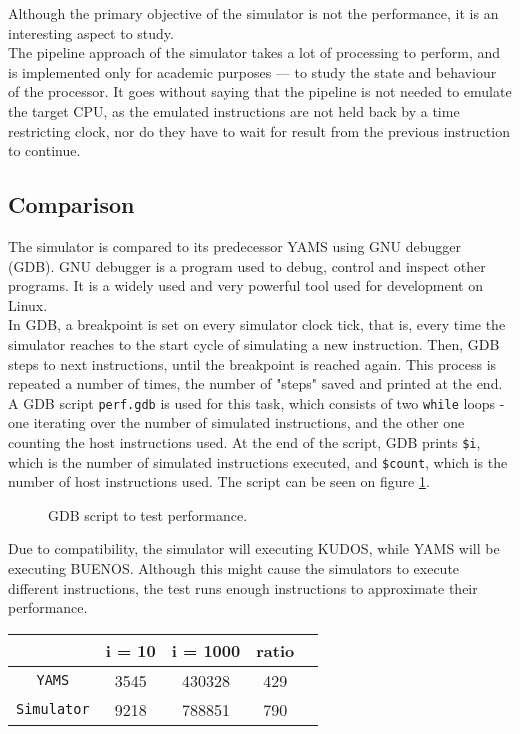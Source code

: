 Although the primary objective of the simulator is not the performance, it is
an interesting aspect to study.\\
The pipeline approach of the simulator takes a lot of processing to perform,
and is implemented only for academic purposes --- to study the state and behaviour
of the processor. It goes without saying that the pipeline is not needed to
emulate the target CPU, as the emulated instructions are not held back by a time
restricting clock, nor do they have to wait for result from the previous instruction to
continue.\\

\subsection{Comparison}
The simulator is compared to its predecessor YAMS using GNU debugger (GDB). GNU debugger
is a program used to debug, control and inspect other programs. It is a widely
used and very powerful tool used for development on Linux\cite{gdb}.\\
In GDB, a breakpoint is set on every simulator clock tick, that is, every time
the simulator reaches to the start cycle of simulating a new instruction. Then,
GDB steps to next instructions, until the breakpoint is reached again. This
process is repeated a number of times, the number of "steps" saved and printed
at the end. A GDB script \texttt{perf.gdb} is used for this task, which consists
of two \texttt{while} loops - one iterating over the number of simulated instructions,
and the other one counting the host instructions used. At the end of the script,
GDB prints \texttt{\$i}, which is the number of simulated instructions executed,
and \texttt{\$count}, which is the number of host instructions used. The script
can be seen on figure \ref{fig:gdb_perf}.
\begin{figure}

\caption{GDB script to test performance.}
\label{fig:gdb_perf}
\end{figure}

Due to compatibility, the simulator will executing KUDOS, while YAMS will be
executing BUENOS. Although this might cause the simulators to execute different
instructions, the test runs enough instructions to approximate their performance.

\begin{center}
    \begin{tabular}{ | c | c | c | c | r | }
    \hline
    & i = 10 & i = 1000 & ratio \\ \hline \hline
    \texttt{YAMS} & 3545 & 430328 &  429\\ \hline
    \texttt{Simulator} & 9218 & 788851 & 790 \\ \hline
    \end{tabular}
\end{center}


